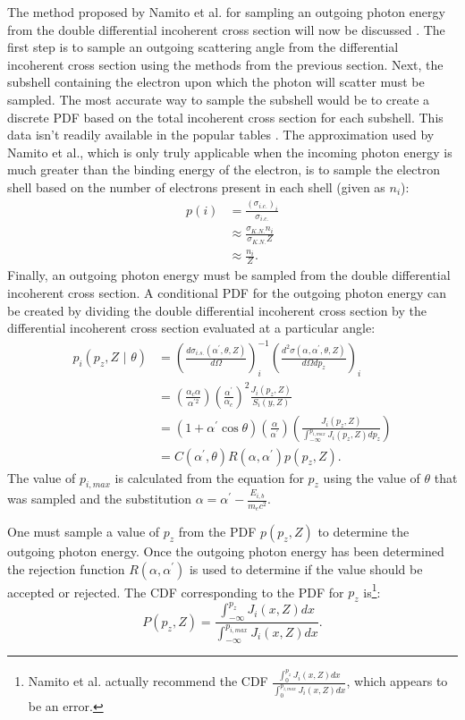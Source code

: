 The method proposed by Namito et al. for sampling an outgoing photon energy
from the double differential incoherent cross section will now be discussed
\citep{namito_implementation_1994}. The first step is to sample an outgoing
scattering angle from the differential incoherent cross section using the 
methods from the previous section. Next, the subshell containing the electron 
upon which the photon will scatter must be sampled. The most accurate
way to sample the subshell would be to create a discrete PDF based on the total
incoherent cross section for each subshell. This data isn't readily available in
the popular tables \citep{cullen_epdl97_1997}. The approximation used by Namito 
et al., which is only truly applicable when the incoming photon energy is much 
greater than the binding energy of the electron, is to sample the electron shell
based on the number of electrons present in each shell (given as $n_i$):
\begin{align}
  p(i) & = \frac{(\sigma_{i.c.})_i}{\sigma_{i.c.}} \nonumber \\
  & \approx \frac{\sigma_{K.N.}n_i}{\sigma_{K.N.}Z} \nonumber \\
  & \approx \frac{n_i}{Z}.
\end{align}
Finally, an outgoing photon energy must be sampled from the double differential 
incoherent cross section. A conditional PDF for the outgoing photon energy can 
be created by dividing the double differential incoherent cross section by the 
differential incoherent cross section evaluated at a particular angle: 
\begin{align}
  p_i(p_z,Z \text{ | } \theta) & = 
  \left(\frac{d\sigma_{i.s.}(\alpha^{'},\theta,Z)}{d\Omega} \right)_i^{-1}
  \left(\frac{d^2\sigma(\alpha,\alpha^{'},\theta,Z)}{d\Omega dp_z}\right)_i 
  \nonumber \\
  & = \left(\frac{\alpha_c\alpha}{\alpha^{'2}}\right)
  \left(\frac{\alpha^{'}}{\alpha_c}\right)^2
  \frac{J_i(p_z,Z)}{S_i(y,Z)} \nonumber \\
  & = (1 + \alpha^{'}\cos{\theta})\left(\frac{\alpha}{\alpha^{'}}\right)
  \left(\frac{J_i(p_z,Z)}{\int_{-\infty}^{p_{i,max}}J_i(p_z,Z)dp_z}\right) \nonumber\\
  & = C(\alpha^{'},\theta)R(\alpha,\alpha^{'})p(p_z,Z).
\end{align}
The value of $p_{i,max}$ is calculated from the equation for $p_z$ using the 
value of $\theta$ that was sampled and the substitution 
$\alpha = \alpha^{'}-\frac{E_{i,b}}{m_ec^2}$.

One must sample a value of $p_z$ from the PDF $p(p_z,Z)$ to determine the
outgoing photon energy. Once the outgoing photon energy has been determined
the rejection function $R(\alpha,\alpha^{'})$ is used to determine if the value 
should be accepted or rejected. The CDF corresponding to the PDF for $p_z$ is\footnote{Namito et al. actually recommend the CDF $\frac{\int_{0}^{p_z}J_i(x,Z)dx}{\int_{0}^{p_{i,max}}J_i(x,Z)dx}$, which appears to be an error.}:
\begin{equation}
  P(p_z,Z) = \frac{\int_{-\infty}^{p_z}J_i(x,Z)dx}{\int_{-\infty}^{p_{i,max}}J_i(x,Z)dx}.
\end{equation}

